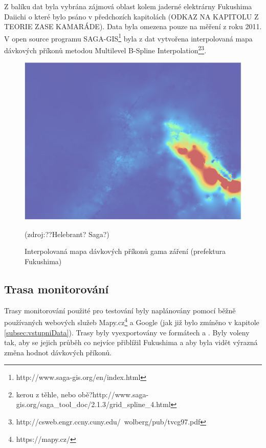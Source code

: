 Z balíku dat byla vybrána zájmová oblast kolem jaderné elektrárny Fukushima Daiichi o které bylo psáno v předchozích kapitolách (ODKAZ NA KAPITOLU Z TEORIE ZASE KAMARÁDE). Data byla omezena pouze na měření z roku 2011. V open source programu SAGA-GIS\footnote{http://www.saga-gis.org/en/index.html} byla z dat vytvořena interpolovaná mapa dávkových příkonů metodou Multilevel B-Spline Interpolation\footnote{kerou z těhle, nebo obě?http://www.saga-gis.org/saga\_tool\_doc/2.1.3/grid\_spline\_4.html}\footnote{http://csweb.engr.ccny.cuny.edu/~wolberg/pub/tvcg97.pdf}. 

\begin{figure}[H]
    \centering
    \includegraphics[scale=0.4]{./pictures/interpolovana_mapa.png}
      	\caption[Interpolovaná mapa dávkových příkonů gama záření (prefektura Fukushima)]{Interpolovaná mapa dávkových příkonů gama záření (prefektura Fukushima)}(zdroj:??Helebrant? Saga?)
    	\label{fig:interpolatedMap}
\end{figure} 

\subsection{Trasa monitorování}
Trasy monitorování použité pro testování byly naplánovány pomocí běžně používaných webových služeb Mapy.cz\footnote{https://mapy.cz/} a Google (jak již bylo zmíněno v kapitole \ref{subsec:vstupniData}). Trasy byly vyexportovány ve formátech  a . Byly voleny tak, aby se jejich průběh co nejvíce přiblížil  Fukushima a aby byla vidět výrazná změna hodnot dávkových příkonů.

